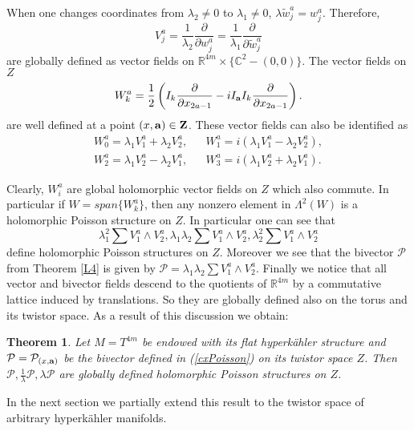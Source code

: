 \documentclass[11pt,oneside,leqno]{amsart}
\theoremstyle{plain}
\newtheorem{theorem}{Theorem}[section]
\theoremstyle{definition}
\begin{document}
  When one changes coordinates from $\lambda_2\neq 0$ to
  $\lambda_1\neq 0$, $\lambda{\tilde w}^a_j=w^a_j.$
  Therefore,
  \begin{equation}\label{vaj}
  V^a_j =\frac{1}{\lambda_2}\frac{\partial}{\partial w^a_j}
  =\frac{1}{\lambda_1}\frac{\partial}{\partial {\tilde w}^a_j}
  \end{equation}
  are globally defined as vector fields on $\mathbb{R}^{4m}\times\{\mathbb{C}^2 -(0,0)\}$.
  The vector fields on $Z$
   \begin{equation}\label{twisted fields}
  W_k^a=\frac{1}{2}\left(I_k\frac{\partial}{\partial x_{2a-1}}
      -iI_{\bf{a}}I_k\frac{\partial}{\partial x_{2a-1}}\right).
  \end{equation}
are well defined at a point $(x,\bf{a}) \in Z$.  These vector fields can also be identified as
  \begin{eqnarray}
  W_0^a=\lambda_1V_1^a+\lambda_2V_2^a,
  & &
  W_1^a=i(\lambda_1V_1^a-\lambda_2V_2^a),
  \nonumber\\
  W_2^a=\lambda_1V_2^a-\lambda_2V_1^a,
   & &
  W_3^a=i(\lambda_1V_2^a+\lambda_2V_1^a).
  \end{eqnarray}

Clearly, $W_i^a$ are global holomorphic vector fields on $Z$ which also commute. In particular if $W=span\{W_k^a\}$, then any nonzero element in $\Lambda^2(W)$ is a holomorphic Poisson structure on $Z$. In particular one can see that $$\lambda_1^2\sum V_1^a\wedge V_2^a, \lambda_1\lambda_2\sum V_1^a\wedge V_2^a, \lambda_2^2\sum V_1^a\wedge V_2^a$$
define holomorphic Poisson structures on $Z$. Moreover we see that the bivector $\mathcal{P}$ from Theorem \ref{L4} is given by $\mathcal{P}=\lambda_1\lambda_2\sum V_1^a\wedge V_2^a$. Finally we notice that all vector and bivector fields descend to the quotients of $\mathbb{R}^{4m}$ by a commutative lattice induced by translations. So they are globally defined also on the torus and its twistor space. As a result of this discussion we obtain:

\begin{theorem}\label{flatcase}
Let $M=T^{4m}$ be endowed with its  flat hyperk\"ahler structure and $\mathcal{P}=\mathcal{P}_{(x,{\bf a})}$ be the bivector defined in (\ref{cxPoisson}) on its twistor space $Z$. Then $\mathcal{P}, \frac{1}{\lambda}\mathcal{P}, \lambda\mathcal{P}$ are globally defined holomorphic Poisson structures on $Z$.

\end{theorem}

In the next section we partially extend this result to the twistor space of arbitrary hyperk\"ahler manifolds.
\end{document}
